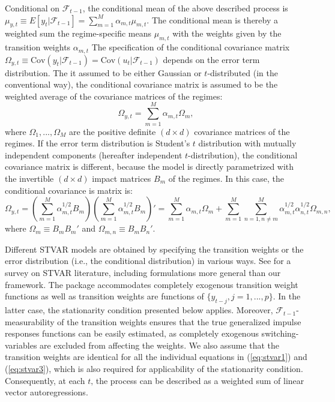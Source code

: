 \documentclass[nojss]{jss}
\begin{document}
Conditional on $\mathcal{F}_{t-1}$, the conditional mean of the above described process is $\mu_{y,t} \equiv E[y_t|\mathcal{F}_{t-1}] = \sum_{m=1}^M \alpha_{m,t}\mu_{m,t}$. The conditional mean is thereby a weighted sum the regime-specific means $\mu_{m,t}$ with the weights given by the transition weights $\alpha_{m,t}$ The specification of the conditional covariance matrix $\Omega_{y,t}\equiv \text{Cov}(y_t|\mathcal{F}_{t-1})=\text{Cov}(u_t|\mathcal{F}_{t-1})$ depends on the error term distribution. The it assumed to be either Gaussian or $t$-distributed (in the conventional way), the conditional covariance matrix is assumed to be the weighted average of the covariance matrices of the regimes:
\begin{equation}
\Omega_{y,t} = \sum_{m=1}^M \alpha_{m,t}\Omega_m,
\end{equation}
where $\Omega_1,...,\Omega_M$ are the positive definite $(d\times d)$ covariance matrices of the regimes. If the error term distribution is Student's $t$ distribution with mutually independent components (hereafter independent $t$-distribution), the conditional covariance matrix is different, because the model is directly parametrized with the invertible $(d\times d)$ impact matrices $B_m$ of the regimes. In this case, the conditional covariance is matrix is:
\begin{equation}\label{eq:condcovmat}
\Omega_{y,t} = \left(\sum_{m=1}^M \alpha_{m,t}^{1/2}B_m \right) \left(\sum_{m=1}^M \alpha_{m,t}^{1/2}B_m \right)' = \sum_{m=1}^M \alpha_{m,t}\Omega_m +  \sum_{m=1}^M\sum_{n=1,n\neq m}^M\alpha_{m,t}^{1/2}\alpha_{n,t}^{1/2}\Omega_{m,n},
\end{equation}
where $\Omega_m\equiv B_mB_m'$ and $\Omega_{m,n}\equiv B_mB_n'$.

Different STVAR models are obtained by specifying the transition weights or the error distribution (i.e., the conditional distribution) in various ways. See \cite{Hubrich+Terasvirta:2013} for a survey on STVAR literature, including formulations more general than our framework. The package  accommodates completely exogenous transition weight functions as well as transition weights are functions of $\lbrace y_{t-j}, j=1,...,p \rbrace$. In the latter case, the stationarity condition presented below applies. Moreover, $\mathcal{F}_{t-1}$-measurability of the transition weights ensures that the true generalized impulse responses functions \citep{Koop+Pesaran+Potter:1996} can be easily estimated, as completely exogenous switching-variables are excluded from affecting the weights. We also assume that the transition weights are identical for all the individual equations in (\ref{eq:stvar1}) and (\ref{eq:stvar3}), which is also required for applicability of the stationarity condition. Consequently, at each $t$‚ the process can be described as a weighted sum of linear vector autoregressions.
\end{document}
